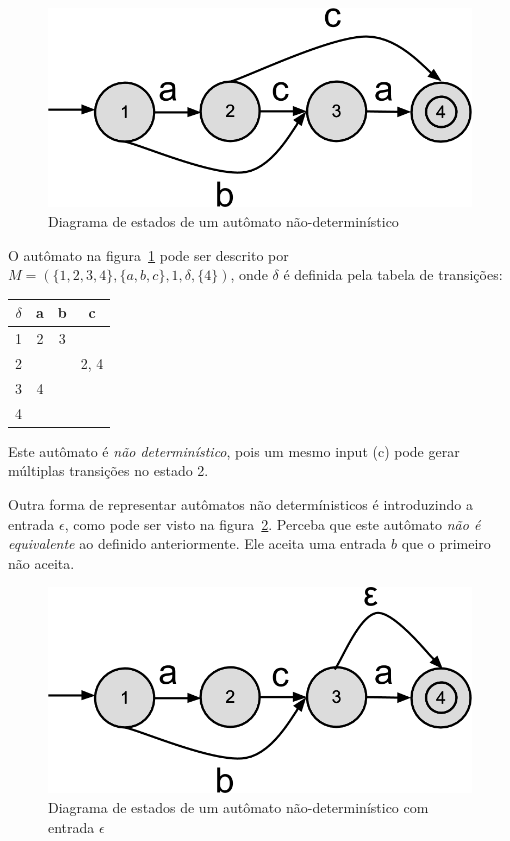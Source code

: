 \documentclass[a4paper,12pt,oneside,onecolumn]{uerj}
\begin{document}
\begin{figure}[ht]
  \centering
  \includegraphics[scale=0.3]{figures/exemplo_automato_numerado.png}
  \caption{Diagrama de estados de um autômato não-determinístico}
  \label{fig:exemplo_automato_numerado}
\end{figure}

O autômato na figura~\ref{fig:exemplo_automato_numerado} pode ser descrito por $M=(\{1,2,3,4\}, \{a,b,c\}, 1, \delta, \{4\})$, onde $\delta$ é definida pela tabela de transições:

\begin{center}
	\begin{tabular}{ c || c | c | c }
		{\bf $\delta$} & {\bf a} & {\bf b} & {\bf c} \\
		\hline 
		\hline 
		1 & 2 & 3 &  \\ 
		\hline 
		2 &   &   & 2, 4 \\ 
		\hline 
		3 & 4 &   &  \\ 
		\hline 
		4 &   &   &  \\ 
	\end{tabular}
\end{center}

Este autômato é \emph{não determinístico}, pois um mesmo input (c) pode gerar múltiplas transições no estado 2. 

Outra forma de representar autômatos não determínisticos é introduzindo a entrada $\epsilon$, como pode ser visto na figura~\ref{fig:exemplo_automato_epsilon}. Perceba que este autômato \emph{não é equivalente} ao definido anteriormente. Ele aceita uma entrada $b$ que o primeiro não aceita.

\begin{figure}[ht]
  \centering
  \includegraphics[scale=0.3]{figures/exemplo_automato_epsilon.png}
  \caption{Diagrama de estados de um autômato não-determinístico com entrada $\epsilon$}
  \label{fig:exemplo_automato_epsilon}
\end{figure}
\end{document}
